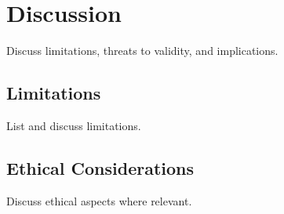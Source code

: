 \chapter{Discussion}

Discuss limitations, threats to validity, and implications.

\section{Limitations}
List and discuss limitations.

\section{Ethical Considerations}
Discuss ethical aspects where relevant.
